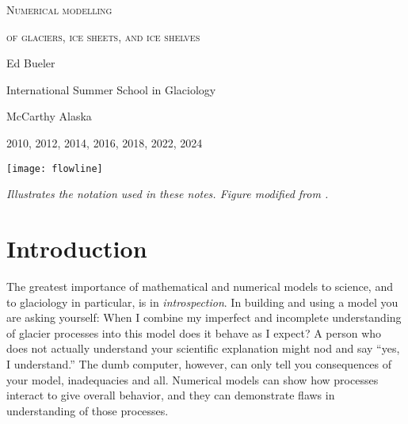 \documentclass[letterpaper,final,12pt,reqno]{amsart}
\begin{document}
\graphicspath{{../figures/}}

\begin{titlepage}

  \begin{center}
  \phantom{foo}
    \vspace{1.0cm}

     {\Large \textsc{Numerical modelling}}
    \vspace{0.7cm}

     {\Large \textsc{of glaciers, ice sheets, and ice shelves}}

    \vspace{1.5cm}

    {\large Ed Bueler}
    \vspace{1cm}

    International Summer School in Glaciology

    McCarthy Alaska

    2010, 2012, 2014, 2016, 2018, 2022, 2024

    \vfill
    
    \texttt{[image: flowline]}
  
    \scriptsize \emph{Illustrates the notation used in these notes.  Figure modified from \cite{SchoofMarine1}.} \normalsize
    
    \vspace{1.5in}
  \end{center}
\end{titlepage}

\clearpage\newpage

\setcounter{page}{2}
\section{Introduction}  \label{sec:intro}

The greatest importance of mathematical and numerical models to science, and to glaciology in particular, is in \emph{introspection}.  In building and using a model you are asking yourself: When I combine my imperfect and incomplete understanding of glacier processes into this model does it behave as I expect?  A person who does not actually understand your scientific explanation might nod and say ``yes, I understand.''  The dumb computer, however, can only tell you consequences of your model, inadequacies and all.  Numerical models can show how processes interact to give overall behavior, and they can demonstrate flaws in understanding of those processes.
\end{document}
